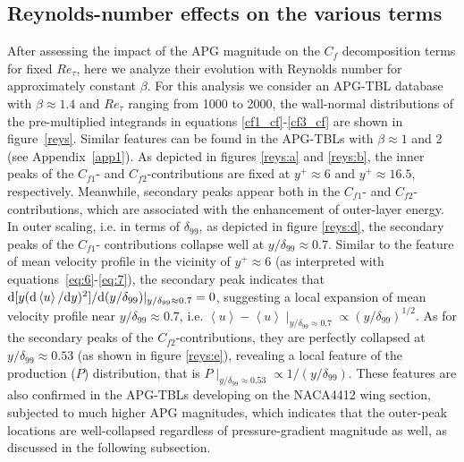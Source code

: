 \subsection{Reynolds-number effects on the various terms}\label{Re-eff}
After assessing the impact of the APG magnitude on the $C_f$ decomposition terms for fixed $Re_{\tau}$, here we analyze their evolution with Reynolds number for approximately constant $\beta$. For this analysis we consider an APG-TBL database with $\beta\approx1.4$ and $Re_\tau$ ranging from 1000 to 2000, the wall-normal distributions of the pre-multiplied integrands in equations \eqref{cf1_cf}-\eqref{cf3_cf} are shown in figure~\ref{reys}. Similar features can be found in the APG-TBLs with $\beta\approx 1$ and 2 (see Appendix~\ref{app1}). As depicted in figures \ref{reys:a} and \ref{reys:b}, the inner peaks of the $C_{f1}$- and $C_{f2}$-contributions are fixed at $y^+\approx6$ and $y^+\approx16.5$, respectively.
Meanwhile, secondary peaks appear both in the $C_{f1}$- and $C_{f2}$-contributions, which are associated with the enhancement of outer-layer energy.
{\color{black}
In outer scaling, i.e. in terms of $\delta_{99}$, as depicted in figure \ref{reys:d}, the secondary peaks of the $C_{f1}$- contributions collapse well at $y/\delta_{99}\approx0.7$. Similar to the feature of mean velocity profile in the vicinity of $y^+\approx6$ (as interpreted with equations~\eqref{eq:6}-\eqref{eq:7}), the secondary peak indicates that ${\rm d} [{y({\rm d}\left<u\right>/{\rm d} y)^2}]/{\rm d} (y/\delta_{99})|_{y/\delta_{99}\approx0.7}=0$, suggesting a local expansion of mean velocity profile near $y/\delta_{99}\approx0.7$, i.e. 
$\left<u\right>-\left<u\right>\mid_{y/\delta_{99}\approx0.7}\propto (y/\delta_{99})^{1/2}$.
As for the secondary peaks of the $C_{f2}$-contributions, they are perfectly collapsed at $y/\delta_{99}\approx0.53$ (as shown in figure \ref{reys:e}), revealing a local feature of the production ($P$) distribution, that is $P\mid_{y/\delta_{99}\approx0.53}\propto1/(y/\delta_{99})$.}
These features are also confirmed in the APG-TBLs developing on the NACA4412 wing section, subjected to much higher APG magnitudes, {\color{black}which indicates that the outer-peak locations are well-collapsed regardless of pressure-gradient magnitude as well,} as discussed in the following subsection.



